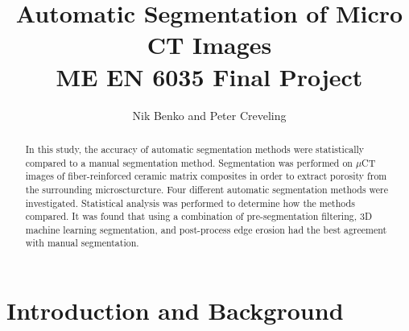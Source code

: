 \documentclass[11pt, twocolumn]{article}
\begin{document}
\title{ Automatic Segmentation of Micro CT Images  \\ \normalsize{ME EN 6035 Final Project}}
\author{Nik Benko and Peter Creveling}
\maketitle


\begin{abstract} 
In this study, the accuracy of automatic segmentation methods were statistically compared to a manual segmentation method. Segmentation was performed on $\mu$CT images of fiber-reinforced ceramic matrix composites in order to extract porosity from the surrounding microscturcture. Four different automatic segmentation methods were investigated. Statistical analysis was performed to determine how the methods compared. It was found that using a combination of pre-segmentation filtering, 3D machine learning segmentation, and post-process edge erosion had the best agreement with manual segmentation.
\end{abstract}

\section{Introduction and Background}
\end{document}
